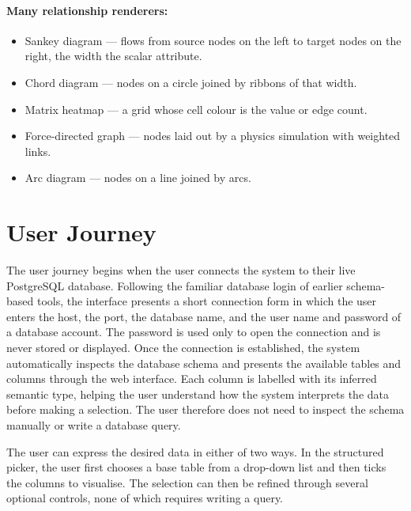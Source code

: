 \paragraph{Many relationship renderers:}
\begin{itemize}
  \item Sankey diagram --- flows from source nodes on the left to target nodes on the right, the width the scalar attribute.
  \item Chord diagram --- nodes on a circle joined by ribbons of that width.
  \item Matrix heatmap --- a grid whose cell colour is the value or edge count.
  \item Force-directed graph --- nodes laid out by a physics simulation with weighted links.
  \item Arc diagram --- nodes on a line joined by arcs.
\end{itemize}

\section{User Journey}
\label{sec:user-journey}

The user journey begins when the user connects the system to their live PostgreSQL database. Following the familiar database login of earlier schema-based tools, the interface presents a short connection form in which the user enters the host, the port, the database name, and the user name and password of a database account. The password is used only to open the connection and is never stored or displayed. Once the connection is established, the system automatically inspects the database schema and presents the available tables and columns through the web interface. Each column is labelled with its inferred semantic type, helping the user understand how the system interprets the data before making a selection. The user therefore does not need to inspect the schema manually or write a database query.

The user can express the desired data in either of two ways. In the structured picker, the user first chooses a base table from a drop-down list and then ticks the columns to visualise. The selection can then be refined through several optional controls, none of which requires writing a query.

